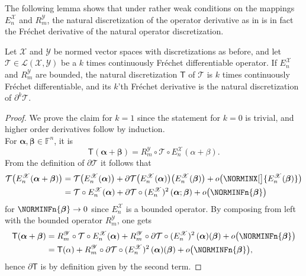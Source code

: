 \documentclass[a4paper]{paper}
\newcommand*{\SPC}[1]{{\ensuremath{\mathscr{#1}}}}
\newcommand*{\SPCL}{\SPC{L}}
\newcommand*{\SPCX}{\SPC{X}}
\newcommand*{\SPCY}{\SPC{Y}}
\newcommand*{\BLINOP}[2]{{\SPCL(#1, #2)}}
\newcommand*{\FIELD}{{\ensuremath{\mathbb{F}}}}
\newcommand*{\Fn}{{\ensuremath{\FIELD^n}}}
\newcommand*{\OP}[1]{{\ensuremath{\mathcal{#1}}}}
\newcommand*{\OPT}{\OP{T}}
\newcommand{\DISCOP}[1]{{\ensuremath{\mathsf{#1}}}}
\newcommand*{\DISCOPT}{\DISCOP{T}}
\newcommand*{\EXT}[2]{\ensuremath{E_{#1}^{#2}}}
\newcommand*{\REST}[2]{\ensuremath{R_{#1}^{#2}}}
\newcommand*{\RmY}{{\ensuremath{\REST{m}{\SPC{Y}}}}}
\newcommand*{\EnX}{{\ensuremath{\EXT{n}{\SPC{X}}}}}
\newcommand*{\BDalpha}{\boldsymbol{\alpha}}
\newcommand*{\BDbeta}{\boldsymbol{\beta}}
\begin{document}
The following lemma shows that under rather weak conditions on the mappings $E_n^{\SPCX}$ and $R_m^{\SPCY}$, the 
natural discretization of the operator derivative as in  is in 
fact the Fr\'{e}chet derivative of the natural operator discretization.


\begin{lemma}
 \label{lemma:discr:operator:op_deriv:natural_is_deriv}
 Let $\SPCX$ and $\SPCY$ be normed vector spaces with discretizations as before, and let 
 $\OPT \in \BLINOP{\SPCX}{\SPCY}$ be a $k$ times continuously Fr\'{e}chet differentiable 
 operator. If $E_n^{\SPCX}$ and $R_m^{\SPCY}$ are bounded, the natural discretization $\DISCOPT$ of $\OPT$ is 
 $k$ times  continuously Fr\'{e}chet differentiable, and its $k$'th Fr\'{e}chet derivative is the natural 
 discretization of $\partial^k\OPT$.
\end{lemma}
\vspace{1em}


\begin{proof}
 We prove the claim for $k=1$ since the statement for $k=0$ is trivial, and higher order derivatives follow by 
 induction.\\
 For $\BDalpha,\BDbeta \in \Fn$, it is
 \begin{equation*}
  \DISCOPT(\BDalpha + \BDbeta) = \RmY \circ \OPT \circ \EnX (\alpha + \beta).
 \end{equation*}
 From the definition of $\partial \OPT$ it follows that
 \begin{align*}
  \OPT\big(\EnX(\BDalpha + \BDbeta)\big)
  &= \OPT\big(\EnX(\BDalpha)\big) + \partial\OPT\big(\EnX(\BDalpha)\big)\big(\EnX(\BDbeta)\big) +
  o\big(\NORMINX[\big]{\EnX(\BDbeta)}\big) \\
  &= \OPT \circ \EnX(\BDalpha) + \partial\OPT\circ (\EnX)^2\,(\BDalpha; \BDbeta) + o\big(\NORMINFn{\BDbeta} \big)
 \end{align*}
 for $\NORMINFn{\BDbeta} \to 0$ since $\EnX$ is a bounded operator. By composing from left with the bounded operator 
 $\RmY$, one gets
 \begin{align*}
  \DISCOPT(\BDalpha + \BDbeta)
  &= \RmY \circ \OPT \circ \EnX(\BDalpha) + \RmY \circ \partial\OPT\circ (\EnX)^2\,(\BDalpha)(\BDbeta) +
  o\big(\NORMINFn{\BDbeta} \big) 
  \\
  &= \DISCOPT(\alpha) + \RmY \circ \partial\OPT\circ (\EnX)^2\,(\BDalpha)(\BDbeta) + o\big(\NORMINFn{\BDbeta} \big),
 \end{align*}
 hence $\partial\DISCOPT$ is by definition given by the second term.
\end{proof}
\end{document}
